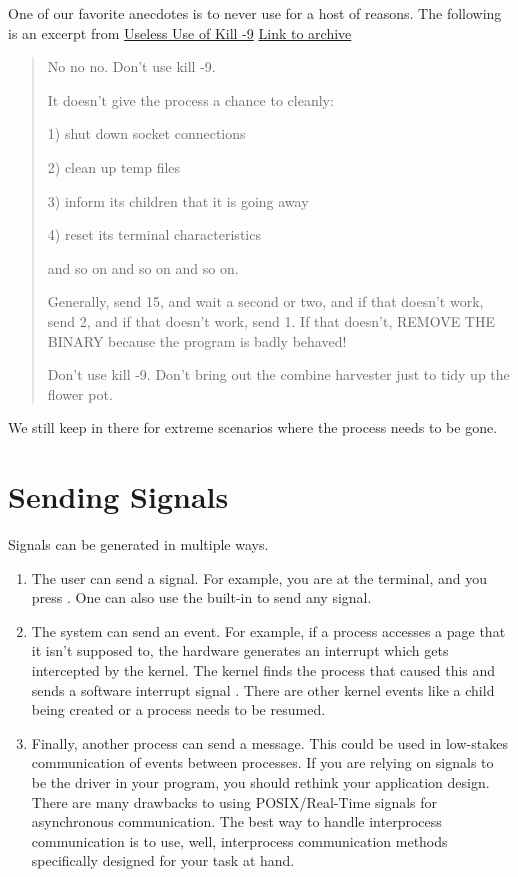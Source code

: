 One of our favorite anecdotes is to never use  for a host of reasons.
The following is an excerpt from \underline{Useless Use of Kill -9} \href{http://porkmail.org/era/unix/award.html}{Link to archive}

\begin{quote}
No no no.  Don't use kill -9.

It doesn't give the process a chance to cleanly:

1) shut down socket connections

2) clean up temp files

3) inform its children that it is going away

4) reset its terminal characteristics

and so on and so on and so on.

Generally, send 15, and wait a second or two, and if that doesn't
work, send 2, and if that doesn't work, send 1.  If that doesn't,
REMOVE THE BINARY because the program is badly behaved!

Don't use kill -9.  Don't bring out the combine harvester just to tidy
up the flower pot.
\end{quote}

We still keep  in there for extreme scenarios where the process needs to be gone.

\section{Sending Signals}

Signals can be generated in multiple ways.
\begin{enumerate}
\item The user can send a signal.
  For example, you are at the terminal, and you press .
  One can also use the built-in  to send any signal.
\item The system can send an event.
For example, if a process accesses a page that it isn't supposed to, the hardware generates an interrupt which gets intercepted by the kernel.
The kernel finds the process that caused this and sends a \gls{software interrupt} signal .
There are other kernel events like a child being created or a process needs to be resumed.

\item Finally, another process can send a message.
  This could be used in low-stakes communication of events between processes.
  If you are relying on signals to be the driver in your program, you should rethink your application design.
  There are many drawbacks to using POSIX/Real-Time signals for asynchronous communication.
  The best way to handle interprocess communication is to use, well, interprocess communication methods specifically designed for your task at hand.
\end{enumerate}

